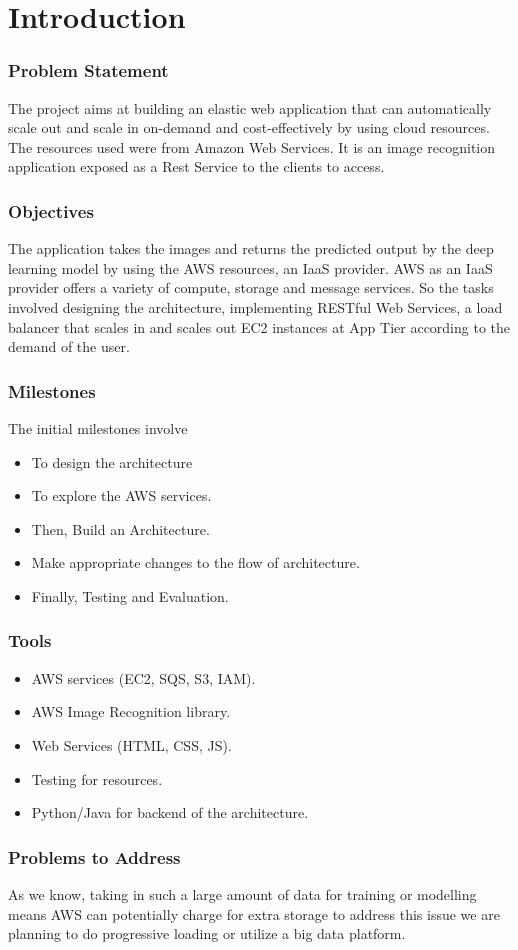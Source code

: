 \documentclass[../main.tex]{subfiles}
\begin{document}
\part*{Introduction}
\section*{Problem Statement}
The project aims at building an elastic web application that can automatically scale out and scale in on-demand and cost-effectively by using cloud resources. The resources used were from Amazon Web Services. It is an image recognition application exposed as a Rest Service to the clients to access.

\section*{Objectives}
 The application takes the images and returns the predicted output by the deep learning model by using the AWS resources, an IaaS provider. AWS as an IaaS provider offers a variety of compute, storage and message services. So the tasks involved designing the architecture, implementing RESTful Web Services, a load balancer that scales in and scales out EC2 instances at App Tier according to the demand of the user.
 
\section*{Milestones}
The initial milestones involve
\begin{itemize}
\item To design the architecture
\item To explore the AWS services.
\item Then, Build an Architecture.
\item Make appropriate changes to the flow of architecture.
\item Finally, Testing and Evaluation.
\end{itemize}

\section*{Tools}
\begin{itemize}
    \item AWS services (EC2, SQS, S3, IAM).
    \item AWS Image Recognition library.
    \item Web Services (HTML, CSS, JS).
    \item Testing for resources.
    \item Python/Java for backend of the architecture.
\end{itemize}

\section*{Problems to Address}
As we know, taking in such a large amount of data for training or modelling means AWS can potentially charge for extra storage to address this issue we are planning to do progressive loading or utilize a big data platform.
\end{document}
